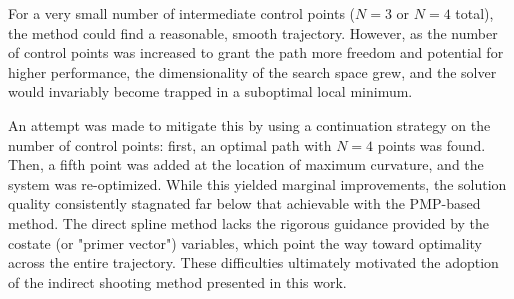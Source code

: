 \documentclass[journal,a4paper]{IEEEtran}
\begin{document}
For a very small number of intermediate control points ($N=3$ or $N=4$ total), the method could find a reasonable, smooth trajectory. However, as the number of control points was increased to grant the path more freedom and potential for higher performance, the dimensionality of the search space grew, and the solver would invariably become trapped in a suboptimal local minimum.

An attempt was made to mitigate this by using a continuation strategy on the number of control points: first, an optimal path with $N=4$ points was found. Then, a fifth point was added at the location of maximum curvature, and the system was re-optimized. While this yielded marginal improvements, the solution quality consistently stagnated far below that achievable with the PMP-based method. The direct spline method lacks the rigorous guidance provided by the costate (or "primer vector") variables, which point the way toward optimality across the entire trajectory. These difficulties ultimately motivated the adoption of the indirect shooting method presented in this work.




\end{document}
